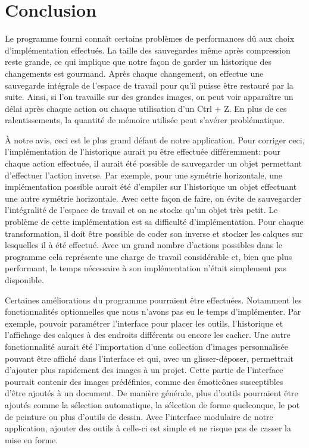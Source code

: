 \section{Conclusion}
Le programme fourni connaît certains problèmes de performances dû aux choix d'implémentation effectués. La taille des sauvegardes même après compression reste grande, ce qui implique que notre façon de garder un historique des changements est gourmand. Après chaque changement, on effectue une sauvegarde intégrale de l'espace de travail pour qu'il puisse être restauré par la suite. Ainsi, si l'on travaille sur des grandes images, on peut voir apparaître un délai après chaque action ou chaque utilisation d'un Ctrl + Z. En plus de ces ralentissements, la quantité de mémoire utilisée peut s'avérer problématique.

À notre avis, ceci est le plus grand défaut de notre application. Pour corriger ceci, l'implémentation de l'historique aurait pu être effectuée différemment: pour chaque action effectuée, il aurait été possible de sauvegarder un objet permettant d'effectuer l'action inverse. Par exemple, pour une symétrie horizontale, une implémentation possible aurait été d'empiler sur l'historique un objet effectuant une autre symétrie horizontale. Avec cette façon de faire, on évite de sauvegarder l'intégralité de l'espace de travail et on ne stocke qu'un objet très petit. Le problème de cette implémentation est sa difficulté d'implémentation. Pour chaque transformation, il doit être possible de coder son inverse et stocker les calques sur lesquelles il à été effectué. Avec un grand nombre d'actions possibles dans le programme cela représente une charge de travail considérable et, bien que plus performant, le temps nécessaire à son implémentation n'était simplement pas disponible.

Certaines améliorations du programme pourraient être effectuées. Notamment les fonctionnalités optionnelles que nous n'avons pas eu le temps d'implémenter. Par exemple, pouvoir paramétrer l'interface pour placer les outils, l'historique et l'affichage des calques à des endroits différents ou encore les cacher. Une autre fonctionnalité aurait été l'importation d'une collection d'images personnalisée pouvant être affiché dans l'interface et qui, avec un glisser-déposer, permettrait d'ajouter plus rapidement des images à un projet. Cette partie de l'interface pourrait contenir des images prédéfinies, comme des émoticônes susceptibles d'être ajoutés à un document. De manière générale, plus d'outils pourraient être ajoutés comme la sélection automatique, la sélection de forme quelconque, le pot de peinture ou plus d'outils de dessin. Avec l'interface modulaire de notre application, ajouter des outils à celle-ci est simple et ne risque pas de casser la mise en forme.

